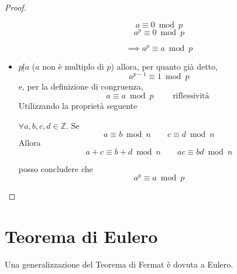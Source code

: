 \documentclass[a4paper,12pt, oneside]{book}
\begin{document}
\begin{teorema}
\begin{proof}
\begin{itemize}
			      \begin{minipage}{0.45\textwidth}
				      $$a \equiv 0 \bmod p$$
				      $$a^p \equiv 0 \bmod p$$
			      \end{minipage}%
			      \hfill
			      \begin{minipage}{0.45\textwidth}
				      $$\implies a^p \equiv a \bmod p$$
			      \end{minipage}%

			\item $p \not| a$ ($a$ non è multiplo di $p$) allora, per quanto già detto,
			      $$a^{p-1} \equiv 1 \bmod p$$
			      e, per la definizione di congruenza, $$a \equiv a \bmod p \qquad \mbox{ riflessività }$$
			      Utilizzando la proprietà seguente
			      \begin{shaded}
				      \begin{nota} $\forall a,b,c,d \in \mathbb{Z}$.
					      Se $$a \equiv b \bmod n \qquad c \equiv d \bmod n$$
					      Allora $$a+c \equiv b+d \bmod n \qquad ac \equiv bd \bmod n$$
				      \end{nota}
			      \end{shaded}
			      posso concludere che
			      $$a^p \equiv a \bmod p$$
		\end{itemize}

	\end{proof}
\end{teorema}

\section{Teorema di Eulero}
Una generalizzazione del Teorema di Fermat è dovuta a Eulero.
\end{document}
